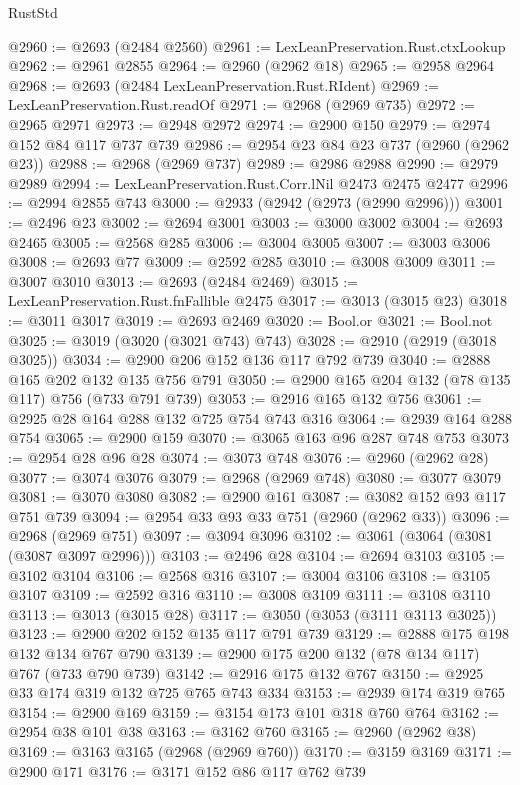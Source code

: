 \begin{lexlean}{RustStd}
\begin{coremodule}
@2960 := @2693 (@2484 @2560)
@2961 := LexLeanPreservation.Rust.ctxLookup
@2962 := @2961 @2855
@2964 := @2960 (@2962 @18)
@2965 := @2958 @2964
@2968 := @2693 (@2484 LexLeanPreservation.Rust.RIdent)
@2969 := LexLeanPreservation.Rust.readOf
@2971 := @2968 (@2969 @735)
@2972 := @2965 @2971
@2973 := @2948 @2972
@2974 := @2900 @150
@2979 := @2974 @152 @84 @117 @737 @739
@2986 := @2954 @23 @84 @23 @737 (@2960 (@2962 @23))
@2988 := @2968 (@2969 @737)
@2989 := @2986 @2988
@2990 := @2979 @2989
@2994 := LexLeanPreservation.Rust.Corr.lNil @2473 @2475 @2477
@2996 := @2994 @2855 @743
@3000 := @2933 (@2942 (@2973 (@2990 @2996)))
@3001 := @2496 @23
@3002 := @2694 @3001
@3003 := @3000 @3002
@3004 := @2693 @2465
@3005 := @2568 @285
@3006 := @3004 @3005
@3007 := @3003 @3006
@3008 := @2693 @77
@3009 := @2592 @285
@3010 := @3008 @3009
@3011 := @3007 @3010
@3013 := @2693 (@2484 @2469)
@3015 := LexLeanPreservation.Rust.fnFallible @2475
@3017 := @3013 (@3015 @23)
@3018 := @3011 @3017
@3019 := @2693 @2469
@3020 := Bool.or
@3021 := Bool.not
@3025 := @3019 (@3020 (@3021 @743) @743)
@3028 := @2910 (@2919 (@3018 @3025))
@3034 := @2900 @206 @152 @136 @117 @792 @739
@3040 := @2888 @165 @202 @132 @135 @756 @791
@3050 := @2900 @165 @204 @132 (@78 @135 @117) @756 (@733 @791 @739)
@3053 := @2916 @165 @132 @756
@3061 := @2925 @28 @164 @288 @132 @725 @754 @743 @316
@3064 := @2939 @164 @288 @754
@3065 := @2900 @159
@3070 := @3065 @163 @96 @287 @748 @753
@3073 := @2954 @28 @96 @28
@3074 := @3073 @748
@3076 := @2960 (@2962 @28)
@3077 := @3074 @3076
@3079 := @2968 (@2969 @748)
@3080 := @3077 @3079
@3081 := @3070 @3080
@3082 := @2900 @161
@3087 := @3082 @152 @93 @117 @751 @739
@3094 := @2954 @33 @93 @33 @751 (@2960 (@2962 @33))
@3096 := @2968 (@2969 @751)
@3097 := @3094 @3096
@3102 := @3061 (@3064 (@3081 (@3087 @3097 @2996)))
@3103 := @2496 @28
@3104 := @2694 @3103
@3105 := @3102 @3104
@3106 := @2568 @316
@3107 := @3004 @3106
@3108 := @3105 @3107
@3109 := @2592 @316
@3110 := @3008 @3109
@3111 := @3108 @3110
@3113 := @3013 (@3015 @28)
@3117 := @3050 (@3053 (@3111 @3113 @3025))
@3123 := @2900 @202 @152 @135 @117 @791 @739
@3129 := @2888 @175 @198 @132 @134 @767 @790
@3139 := @2900 @175 @200 @132 (@78 @134 @117) @767 (@733 @790 @739)
@3142 := @2916 @175 @132 @767
@3150 := @2925 @33 @174 @319 @132 @725 @765 @743 @334
@3153 := @2939 @174 @319 @765
@3154 := @2900 @169
@3159 := @3154 @173 @101 @318 @760 @764
@3162 := @2954 @38 @101 @38
@3163 := @3162 @760
@3165 := @2960 (@2962 @38)
@3169 := @3163 @3165 (@2968 (@2969 @760))
@3170 := @3159 @3169
@3171 := @2900 @171
@3176 := @3171 @152 @86 @117 @762 @739

\end{coremodule}
\end{lexlean}
